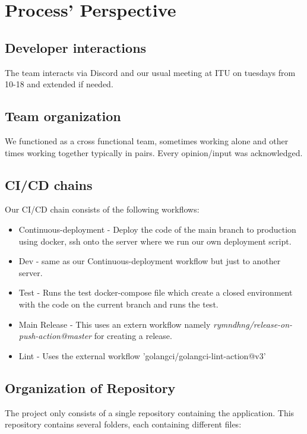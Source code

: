 \section{Process' Perspective}

\subsection{Developer interactions}
The team interacts via Discord and our usual meeting at ITU on tuesdays from 10-18 and extended if needed.

\subsection{Team organization}
We functioned as a cross functional team, sometimes working alone and other times working together typically in pairs. Every opinion/input was acknowledged. 

\subsection{CI/CD chains}
Our CI/CD chain consists of the following workflows:
\begin{itemize}
    \item Continuous-deployment - Deploy the code of the main branch to production using docker, ssh onto the server where we run our own deployment script.
    \item Dev - same as our Continuous-deployment workflow but just to another server.
    \item Test - Runs the test docker-compose file which create a closed environment with the code on the current branch and runs the test.
    \item Main Release - This uses an extern workflow namely \textit{rymndhng/release-on-push-action@master} for creating a release.
    \item Lint - Uses the external workflow 'golangci/golangci-lint-action@v3'
\end{itemize}

\subsection{Organization of Repository}
The project only consists of a single repository containing the application. This repository contains several folders, 
each containing different files: \\

